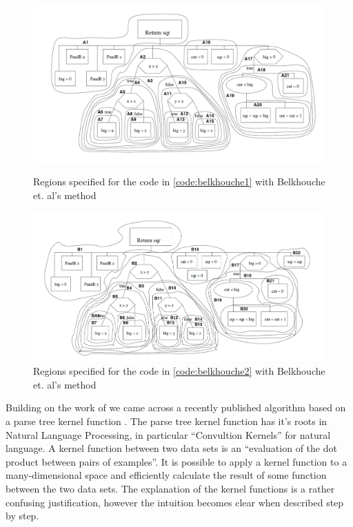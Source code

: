 \begin{figure}[p]
	\centering
		\includegraphics[width=\textwidth]{Figures/Belkhouche1}
	\caption{Regions specified for the code in \cref{code:belkhouche1} with Belkhouche et. al's method~\cite{Belkhouche}}
	\label{fig:belkhoucheRegions1}
	
	\centering
		\includegraphics[width=\textwidth]{Figures/Belkhouche2}
	\caption{Regions specified for the code in \cref{code:belkhouche2} with Belkhouche et. al's method~\cite{Belkhouche}}
	\label{fig:belkhoucheRegions2}

\end{figure}

Building on the work of \cite{Belkhouche}
we came across a recently published algorithm based on a parse tree kernel function
\cite{ParseTreeKernel}. The parse tree kernel function has it's roots
in Natural Language Processing, in particular ``Convultion Kernels'' for natural
language\cite{NLPKernel}. A kernel function between two data sets is an ``evaluation
of the dot product between pairs of examples''\cite{NLPKernel}. It is possible
to apply a kernel function to a many-dimensional space and efficiently calculate
the result of some function between the two data sets. The explanation of the
kernel functions is a rather confusing justification, however the intuition
becomes clear when described step by step.

